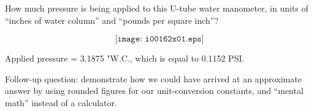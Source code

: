 

How much pressure is being applied to this U-tube water manometer, in units of ``inches of water column'' and ``pounds per square inch''?

$$\texttt{[image: i00162x01.eps]}$$







Applied pressure = 3.1875 "W.C., which is equal to 0.1152 PSI.

\vskip 10pt

Follow-up question: demonstrate how we could have arrived at an approximate answer by using rounded figures for our unit-conversion constants, and ``mental math'' instead of a calculator.












